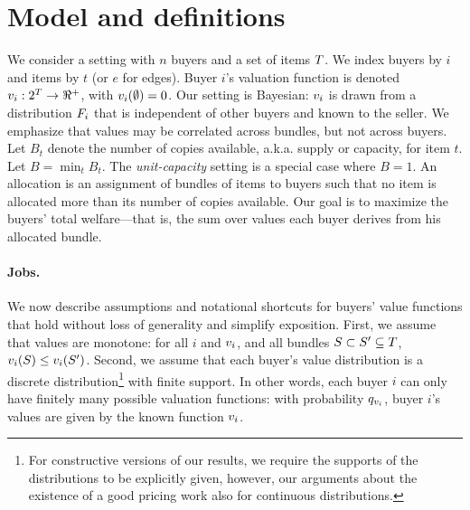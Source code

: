 \section{Model and definitions}
\label{sec:prelim}

We consider a setting with $n$ buyers and a set of items $\items$. We
index buyers by $i$ and items by $t$ (or $e$ for edges). Buyer $i$'s
valuation function is denoted $\vali: 2^{\items} \rightarrow \Re^+$,
with $\vali(\emptyset)=0$. Our setting is Bayesian: $\vali$ is drawn
from a distribution $\disti[i]$ that is independent of other buyers
and known to the seller. We emphasize that values may be correlated
across bundles, but not across buyers. Let $B_t$ denote the number of
copies available, a.k.a.  supply or capacity, for item $t$. Let $B =
\min_t B_t$. The {\em unit-capacity} setting is a special case where
$B=1$. An allocation is an assignment of bundles of items to buyers
such that no item is allocated more than its number of copies
available. Our goal is to maximize the buyers' total welfare---that
is, the sum over values each buyer derives from his allocated bundle.

\paragraph{Jobs.} We now describe assumptions and notational
shortcuts for buyers' value functions that hold without loss of
generality and simplify exposition. First, we assume that values are
monotone: for all $i$ and $\vali$, and all bundles
$S\subset S'\subseteq \items$, $\vali(S)\le\vali(S')$. Second, we assume
that each buyer's value distribution is a discrete
distribution\footnote{For constructive versions of our results, we
  require the supports of the distributions to be explicitly given,
  however, our arguments about the existence of a good pricing work
  also for continuous distributions.} with 
  finite support. In other words, each buyer $i$ can only have
  finitely many possible valuation functions: with probability $\qvi$,
  buyer $i$'s values are given by the known function $\vali$.

